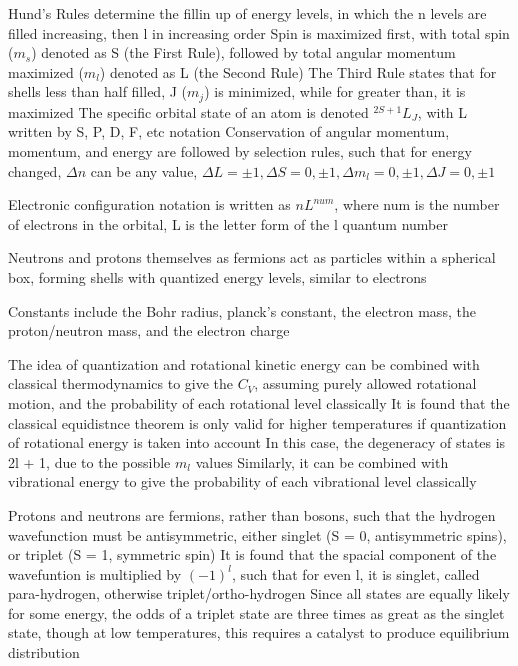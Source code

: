 \documentclass[11 pt, twoside]{article}
\newenvironment{outline*}
{
	\begin{outline}[enumerate]
	}
	{\end{outline}
}
\begin{document}
\begin{outline*}
\1 Hund's Rules determine the fillin up of energy levels, in which the n levels are filled increasing, then l in increasing order
	\2 Spin is maximized first, with total spin ($m_s$) denoted as S (the First Rule), followed by total angular momentum maximized ($m_l$) denoted as L (the Second Rule)
	\2 The Third Rule states that for shells less than half filled, J ($m_j$) is minimized, while for greater than, it is maximized
	\2 The specific orbital state of an atom is denoted $^{2S + 1}L_J$, with L written by S, P, D, F, etc notation
	\2 Conservation of angular momentum, momentum, and energy are followed by selection rules, such that for energy changed, $\Delta n$ can be any value, $\Delta L = \pm 1, \Delta S = 0, \pm 1, \Delta m_l = 0, \pm 1, \Delta J = 0, \pm 1$

\1 Electronic configuration notation is written as $nL^{num}$, where num is the number of electrons in the orbital, L is the letter form of the l quantum number

\1 Neutrons and protons themselves as fermions act as particles within a spherical box, forming shells with quantized energy levels, similar to electrons

\1 Constants include the Bohr radius, planck's constant, the electron mass, the proton/neutron mass, and the electron charge

\1 The idea of quantization and rotational kinetic energy can be combined with classical thermodynamics to give the $C_V$, assuming purely allowed rotational motion, and the probability of each rotational level classically
	\2 It is found that the classical equidistnce theorem is only valid for higher temperatures if quantization of rotational energy is taken into account
	\2 In this case, the degeneracy of states is 2l + 1, due to the possible $m_l$ values
	\2 Similarly, it can be combined with vibrational energy to give the probability of each vibrational level classically

\1 Protons and neutrons are fermions, rather than bosons, such that the hydrogen wavefunction must be antisymmetric, either singlet (S = 0, antisymmetric spins), or triplet (S = 1, symmetric spin)
	\2 It is found that the spacial component of the wavefuntion is multiplied by $(-1)^l$, such that for even l, it is singlet, called para-hydrogen, otherwise triplet/ortho-hydrogen
	\2 Since all states are equally likely for some energy, the odds of a triplet state are three times as great as the singlet state, though at low temperatures, this requires a catalyst to produce equilibrium distribution


\end{outline*}
\end{document}
